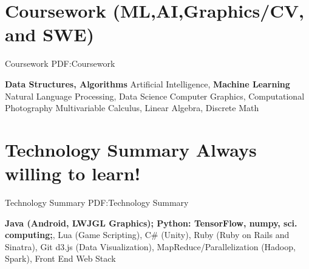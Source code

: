 \documentclass[letterpaper,12pt,oneside]{article}
\begin{document}
\begin{body}

\section
{Coursework \newline (ML,AI,Graphics/CV, and SWE)}
{Coursework}
{PDF:Coursework}

\BulletItem 
\textbf{Data Structures, Algorithms}
\BulletItem
Artificial Intelligence, \textbf{Machine Learning}
\BulletItem
Natural Language Processing, Data Science
\BulletItem
Computer Graphics, Computational Photography
\BulletItem 
Multivariable Calculus, Linear Algebra, Discrete Math


\section
{Technology Summary \newline Always willing to learn!}
{Technology Summary}
{PDF:Technology Summary}

\BulletItem 
\textbf{Java (Android, LWJGL Graphics); Python: TensorFlow, numpy, sci. computing;}, Lua (Game Scripting), \newline 
C\# (Unity), Ruby (Ruby on Rails and Sinatra), Git
\BulletItem 
d3.js (Data Visualization), MapReduce/Parallelization (Hadoop, Spark), Front End Web Stack

\end{body}
\end{document}
